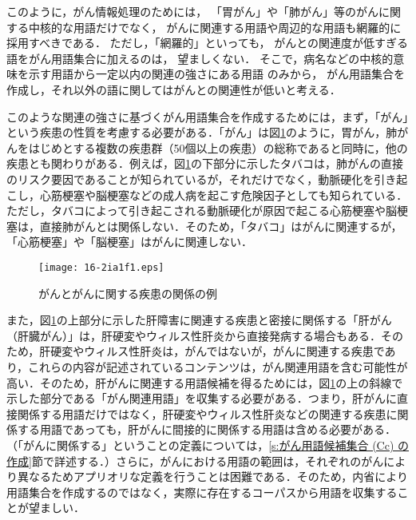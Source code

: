 \documentclass[japanese]{jnlp_1.4}
\begin{document}
このように，がん情報処理のためには，
「胃がん」や「肺がん」等のがんに関する中核的な用語だけでなく，
がんに関連する用語や周辺的な用語も網羅的に採用すべきである．
ただし，「網羅的」といっても，
がんとの関連度が低すぎる語をがん用語集合に加えるのは，
望ましくない．
そこで，病名などの中核的意味を示す用語から一定以内の関連の強さにある用語
のみから，
がん用語集合を作成し，それ以外の語に関してはがんとの関連性が低いと考える．

このような関連の強さに基づくがん用語集合を作成するためには，まず，「がん」という疾患の性質を考慮する必要がある．「がん」は図\ref{f:001}のように，胃がん，肺がんをはじめとする複数の疾患群（50個以上の疾患）の総称であると同時に，他の疾患とも関わりがある．例えば，図\ref{f:001}の下部分に示したタバコは，肺がんの直接のリスク要因であることが知られているが，それだけでなく，動脈硬化を引き起こし，心筋梗塞や脳梗塞などの成人病を起こす危険因子としても知られている．ただし，タバコによって引き起こされる動脈硬化が原因で起こる心筋梗塞や脳梗塞は，直接肺がんとは関係しない．そのため，「タバコ」はがんに関連するが，「心筋梗塞」や「脳梗塞」はがんに関連しない．

\begin{figure}[t]
 \begin{center}
  \texttt{[image: 16-2ia1f1.eps]}
 \end{center}
 \caption{がんとがんに関する疾患の関係の例}
 \label{f:001}
\vspace{-5pt}
\end{figure}

また，図\ref{f:001}の上部分に示した肝障害に関連する疾患と密接に関係する「肝がん（肝臓がん）」は，肝硬変やウィルス性肝炎から直接発病する場合もある．そのため，肝硬変やウィルス性肝炎は，がんではないが，がんに関連する疾患であり，これらの内容が記述されているコンテンツは，がん関連用語を含む可能性が高い．そのため，肝がんに関連する用語候補を得るためには，図\ref{f:001}の上の斜線で示した部分である「がん関連用語」を収集する必要がある．つまり，肝がんに直接関係する用語だけではなく，肝硬変やウィルス性肝炎などの関連する疾患に関係する用語であっても，肝がんに間接的に関係する用語は含める必要がある．（「がんに関係する」ということの定義については，\ref{s:がん用語候補集合 (Cc) の作成}節で詳述する．）さらに，がんにおける用語の範囲は，それぞれのがんにより異なるためアプリオリな定義を行うことは困難である．そのため，内省により用語集合を作成するのではなく，実際に存在するコーパスから用語を収集することが望ましい．
\end{document}
